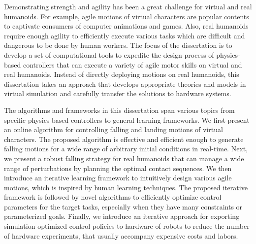 
Demonstrating strength and agility has been a great challenge for virtual and 
real humanoids.
For example, agile motions of virtual characters are popular contents to 
captivate consumers of computer animations and games.
Also, real humanoids require enough agility to efficiently execute various
tasks which are difficult and dangerous to be done by human workers.
The focus of the dissertation is to develop a set of computational tools to
expedite the design process of physics-based controllers that can execute a
variety of agile motor skills on virtual and real humanoids.
Instead of directly deploying motions on real humanoids, this dissertation takes
an approach that develops appropriate theories and models in virtual simulation
and carefully transfer the solutions to hardware systems.

The algorithms and frameworks in this dissertation span various topics from
specific physics-based controllers to general learning frameworks.
We first present an online algorithm for controlling falling and landing
motions of virtual characters.
The proposed algorithm is effective and efficient enough to generate falling
motions for a wide range of arbitrary initial conditions in real-time.
Next, we present a robust falling strategy for real humanoids that can manage
a wide range of perturbations by planning the optimal contact sequences.
We then introduce an iterative learning framework to intuitively design various
agile motions, which is inspired by human learning techniques.
The proposed iterative framework is followed by novel algorithms to
efficiently optimize control parameters for the target tasks, especially when
they have many constraints or parameterized goals.
Finally, we introduce an iterative approach for exporting simulation-optimized
control policies to hardware of robots to reduce the number of hardware
experiments, that usually accompany expensive costs and labors.





